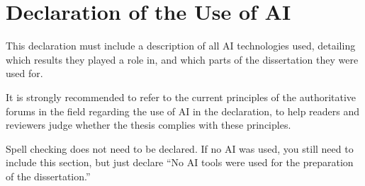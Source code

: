 \chapter*{Declaration of the Use of AI}
\markboth{}{}

This declaration must include a description of all AI technologies used,
detailing which results they played a role in, and which parts of the dissertation
they were used for.

It is strongly recommended to refer to the current principles of the authoritative 
forums in the field regarding the use of AI in the declaration, 
to help readers and reviewers judge whether the thesis complies with these principles.

Spell checking does not need to be declared.
If no AI was used, you still need to include this section, but just declare
``No AI tools were used for the preparation of the dissertation.''
